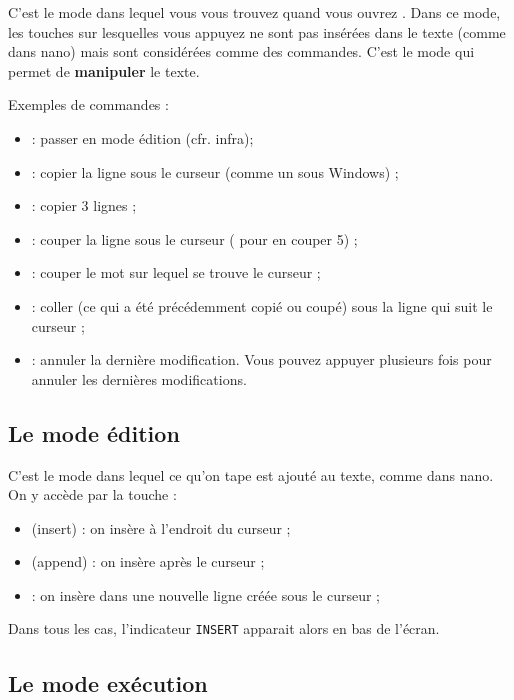 \documentclass[a4paper,11pt]{style-esi/td}
\begin{document}
C'est le mode dans lequel vous vous trouvez quand vous ouvrez .
Dans ce mode, les touches sur lesquelles vous appuyez
ne sont pas insérées dans le texte (comme dans nano)
mais sont considérées comme des commandes.
C'est le mode qui permet de \textbf{manipuler} le texte.

Exemples de commandes :
\begin{itemize}
	\item {} : passer en mode édition (cfr. infra);
	\item {} : copier la ligne sous le curseur (comme un  sous Windows) ;
	\item {}	: copier 3 lignes ;
	\item {} : couper la ligne sous le curseur ( pour en couper 5) ;
	\item {} : couper le mot sur lequel se trouve le curseur ;
	\item {} : coller (ce qui a été précédemment copié ou coupé)
	      sous la ligne qui suit le curseur ;
	\item {} : annuler la dernière modification.
	      Vous pouvez appuyer plusieurs fois pour annuler les dernières modifications.
\end{itemize}

\subsection*{Le mode édition}

C'est le mode dans lequel ce qu'on tape est ajouté au texte,
comme dans nano.
On y accède par la touche :
\begin{itemize}
	\item {} (insert) : on insère à l'endroit du curseur ;
	\item {} (append) : on insère après le curseur ;
	\item {} : on insère dans une nouvelle ligne créée sous le curseur ;
\end{itemize}

Dans tous les cas, l'indicateur \texttt{INSERT}
apparait alors en bas de l'écran.

\subsection*{Le mode exécution}
\end{document}
